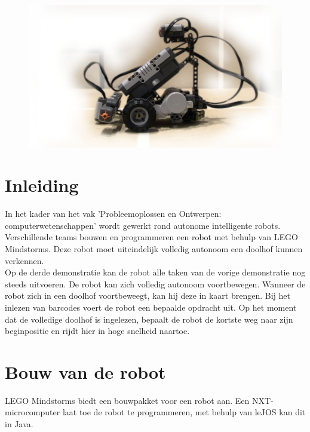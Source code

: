 \documentclass[tt3]{penoverslag}
\begin{document}
\begin{figure}[!hb]
\begin{flushright}
    \includegraphics[width=1\textwidth]{robotFP2}
    \label{fig:robotFP}
\end{flushright}
\end{figure}


\newpage 

\section{Inleiding} %
\label{ssec:inl}
In het kader van het vak 'Probleemoplossen en Ontwerpen: computerwetenschappen' wordt gewerkt rond autonome intelligente robots. Verschillende teams bouwen en programmeren een robot met behulp van LEGO Mindstorms. Deze robot moet uiteindelijk volledig autonoom een doolhof kunnen verkennen.\\
Op de derde demonstratie kan de robot alle taken van de vorige demonstratie nog steeds uitvoeren. De robot kan zich volledig autonoom voortbewegen. Wanneer de robot zich in een doolhof voortbeweegt, kan hij deze in kaart brengen. Bij het inlezen van barcodes voert de robot een bepaalde opdracht uit. Op het moment dat de volledige doolhof is ingelezen, bepaalt de robot de kortste weg naar zijn beginpositie en rijdt hier in hoge snelheid naartoe.

\section{Bouw van de robot} %
\label{sec:bouw}
LEGO Mindstorms \cite{mindstorms} biedt een bouwpakket voor een robot aan. Een NXT-microcomputer laat toe de robot te programmeren, met behulp van leJOS kan dit in Java.
\end{document}
